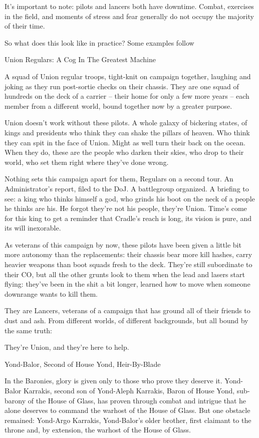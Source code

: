 It’s important to note: pilots and lancers both have downtime. Combat, exercises in the field, and  
moments of stress and fear generally do not occupy the majority of their time.    

So what does this look like in practice? Some examples follow  

Union Regulars: A Cog In The Greatest Machine  

A squad of Union regular troops, tight-knit on campaign together, laughing and joking as they run  
post-sortie checks on their chassis. They are one squad of hundreds on the deck of a carrier --  
their home for only a few more years -- each member from a different world, bound together now  
by a greater purpose.   

Union doesn’t work without these pilots. A whole galaxy of bickering states, of kings and  
presidents who think they can shake the pillars of heaven. Who think they can spit in the face of  
Union. Might as well turn their back on the ocean. When they do, these are the people who  
darken their skies, who drop to their world, who set them right where they’ve done wrong.   

Nothing sets this campaign apart for them, Regulars on a second tour. An Administrator’s report,  
filed to the DoJ. A battlegroup organized. A briefing to see: a king who thinks himself a god, who  
grinds his boot on the neck of a people he thinks are his. He forgot they’re not his people, they’re  
Union. Time’s come for this king to get a reminder that Cradle’s reach is long, its vision is pure,  
and its will inexorable.    

As veterans of this campaign by now, these pilots have been given a little bit more autonomy than  
the replacements: their chassis bear more kill hashes, carry heavier weapons than boot squads  
fresh to the deck. They’re still subordinate to their CO, but all the other grunts look to them when  
the lead and lasers start flying: they’ve been in the shit a bit longer, learned how to move when  
someone downrange wants to kill them.   

They are Lancers, veterans of a campaign that has ground all of their friends to dust and ash.  
From different worlds, of different backgrounds, but all bound by the same truth:   

They’re Union, and they’re here to help.   

Yond-Balor, Second of House Yond, Heir-By-Blade  

In the Baronies, glory is given only to those who prove they deserve it. Yond-Balor Karrakis,  
second son of Yond-Aleph Karrakis, Baron of House Yond, sub-barony of the House of Glass, has  
proven through combat and intrigue that he alone deserves to command the warhost of the House  
of Glass. But one obstacle remained: Yond-Argo Karrakis, Yond-Balor’s older brother, first  
claimant to the throne and, by extension, the warhost of the House of Glass.    

